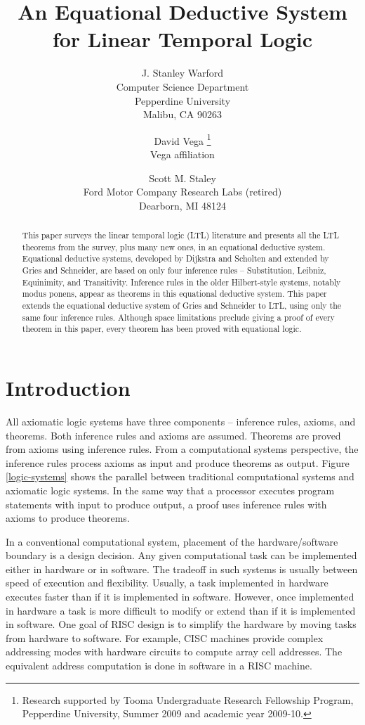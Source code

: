 \documentclass[12pt, fleqn, leqno]{article}
\title{An Equational Deductive System\\for Linear Temporal Logic \opt{complete}{(Complete)}}
\author{
   J. Stanley Warford\\
   Computer Science Department\\
   Pepperdine University\\
   Malibu, CA 90263
   \and
   David Vega
   \thanks{Research supported by Tooma Undergraduate Research Fellowship Program,
   Pepperdine University,
   Summer 2009 and academic year 2009-10.}\\
   Vega affiliation
   \and
   Scott M. Staley\\
   Ford Motor Company Research Labs (retired)\\
   Dearborn, MI 48124}
\date{} %
\begin{document}
\maketitle
\begin{abstract}
This paper surveys the linear temporal logic (LTL) literature and presents all the LTL theorems from the survey, plus many new ones, in an equational deductive system.
Equational deductive systems, developed by Dijkstra and Scholten and extended by Gries and Schneider, are based on only four inference rules -- Substitution, Leibniz, Equinimity, and Transitivity.
Inference rules in the older Hilbert-style systems, notably modus ponens, appear as theorems in this equational deductive system.
This paper extends the equational deductive system of Gries and Schneider to LTL, using only the same four inference rules.
Although space limitations preclude giving a proof of every theorem in this paper, every theorem has been proved with equational logic.
\end{abstract}

\thispagestyle{plain}

\section{Introduction}

All axiomatic logic systems have three components -- inference rules, axioms, and theorems.
Both inference rules and axioms are assumed.
Theorems are proved from axioms using inference rules.
From a computational systems perspective, the inference rules process axioms as input and produce theorems as output.
Figure \ref{logic-systems} shows the parallel between traditional computational systems and axiomatic logic systems.
In the same way that a processor executes program statements with input to produce output, a proof uses inference rules with axioms to produce theorems.

In a conventional computational system, placement of the hardware/software boundary is a design decision.
Any given computational task can be implemented either in hardware or in software.
The tradeoff in such systems is usually between speed of execution and flexibility.
Usually, a task implemented in hardware executes faster than if it is implemented in software.
However, once implemented in hardware a task is more difficult to modify or extend than if it is implemented in software.
One goal of RISC design is to simplify the hardware by moving tasks from hardware to software.
For example, CISC machines provide complex addressing modes with hardware circuits to compute array cell addresses.
The equivalent address computation is done in software in a RISC machine.
\end{document}

